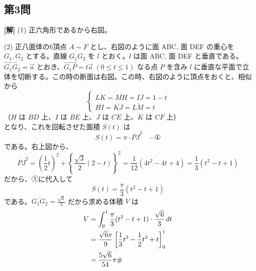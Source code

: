 \documentclass[../main.tex]{subfiles}
\begin{document}
\bigskip

\subsection*{第3問}

\noindent
\textbf{[解]} (1) 正六角形であるから右図。

\begin{center}
\end{center}

\bigskip

\noindent
(2) 正八面体の6頂点 $A \sim F$ とし、右図のように面 ABC, 面 DEF の重心を $G_1, G_2$ とする。直線 $G_1 G_2$ を $l$ とおく。$l$ は面 ABC, 面 DEF と垂直である。$\vec{G_1 G_2} = \vec{a}$ とおき、$\vec{G_1 P} = t \vec{a} \; (0 \le t \le 1)$ なる点 $P$ を含み $l$ に垂直な平面で立体を切断する。この時の断面は右図。この時、右図のように頂点をおくと、相似から
\[
  \begin{cases}
    \overline{LK} = \overline{MH} = \overline{IJ} = 1-t \\
    \overline{HI} = \overline{KJ} = \overline{LM} = t
  \end{cases}
\]
（$H$ は $BD$ 上、$I$ は $BE$ 上、$J$ は $CE$ 上、$K$ は $CF$ 上）\\
となり、これを回転させた面積 $S(t)$ は
\[
  S(t) = \pi \cdot \overline{PJ}^2 \quad \cdots \text{①}
\]
である。右上図から、
\[
  \overline{PJ}^2 = \left(\frac{1}{2}t\right)^2 + \left\{ \frac{\sqrt{3}}{2}(2-t) \right\}^2 = \frac{1}{12}(4t^2 - 4t + 4) = \frac{1}{3}(t^2 - t + 1)
\]
だから、①に代入して
\[
  S(t) = \frac{\pi}{3}(t^2 - t + 1)
\]
である。$\overline{G_1 G_2} = \frac{\sqrt{6}}{3}$ だから求める体積 $V$ は
\begin{align*}
  V &= \int_0^1 \frac{\pi}{3}(t^2 - t + 1) \cdot \frac{\sqrt{6}}{3} \, dt \\
  &= \frac{\sqrt{6}\pi}{9} \left[ \frac{1}{3}t^3 - \frac{1}{2}t^2 + t \right]_0^1 \\
  &= \frac{5\sqrt{6}}{54}\pi \hfill \text{\#}
\end{align*}

\bigskip
\end{document}
